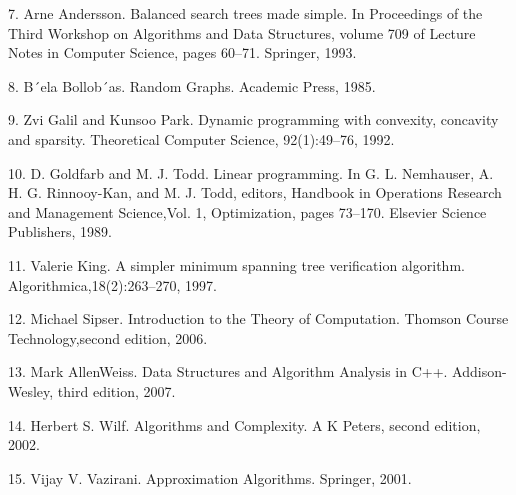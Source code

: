 \documentclass[UTF8]{ctexart}
\begin{document}
    7. Arne Andersson. Balanced search trees made simple. In Proceedings of the Third Workshop on Algorithms and Data Structures, volume 709 of Lecture Notes in Computer Science, pages 60–71. Springer, 1993.

    8. B´ela Bollob´as. Random Graphs. Academic Press, 1985.

    9. Zvi Galil and Kunsoo Park. Dynamic programming with convexity, concavity and sparsity. Theoretical Computer Science, 92(1):49–76, 1992.

    10. D. Goldfarb and M. J. Todd. Linear programming. In G. L. Nemhauser, A. H. G. Rinnooy-Kan, and M. J. Todd, editors, Handbook in Operations Research and Management Science,Vol. 1, Optimization, pages 73–170. Elsevier Science Publishers, 1989.
    
    11. Valerie King. A simpler minimum spanning tree verification algorithm. Algorithmica,18(2):263–270, 1997.
    
    12. Michael Sipser. Introduction to the Theory of Computation. Thomson Course Technology,second edition, 2006.
    
    13. Mark AllenWeiss. Data Structures and Algorithm Analysis in C++. Addison-Wesley, third edition, 2007.
    
    14. Herbert S. Wilf. Algorithms and Complexity. A K Peters, second edition, 2002.
    
    15. Vijay V. Vazirani. Approximation Algorithms. Springer, 2001.
\end{document}
